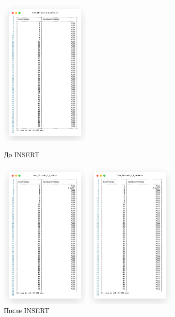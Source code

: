 \begin{figure}[!h]
  \centering

  \begin{minipage}{0.24\textwidth}
    \centering

    \includegraphics[width=4.5cm]
    {../sql/task5/task5_2_2_before.png}

    \caption{До INSERT}
    \label{fig:task5_2_2_before}
  \end{minipage}
  \begin{minipage}{0.24\textwidth}
    \centering

    \includegraphics[width=4.5cm]
    {../sql/task5/task5_2_2_after.png}

    \caption{После INSERT}
    \label{fig:task5_2_2_after}
  \end{minipage}
  \begin{minipage}{0.24\textwidth}
    \centering

    \includegraphics[width=4.5cm]
    {../sql/task5/task5_2_3_before.png}


\end{minipage}
\end{figure}
